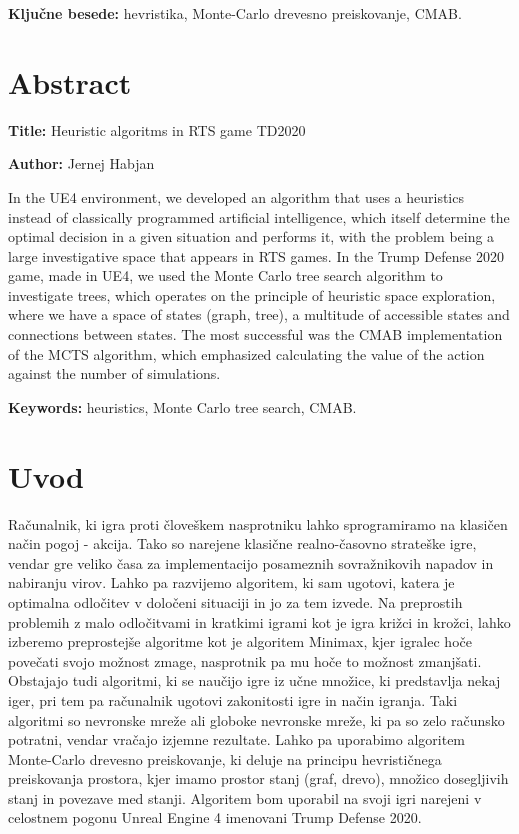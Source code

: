 \documentclass[a4paper, 12pt]{book}
\newcommand{\ttitleEn}{Heuristic algoritms in RTS game TD2020}
\newcommand{\tauthor}{Jernej Habjan}
\newcommand{\tkeywords}{hevristika, Monte-Carlo drevesno preiskovanje, CMAB}
\newcommand{\tkeywordsEn}{heuristics, Monte Carlo tree search, CMAB}
\newcommand{\clearemptydoublepage}{\newpage{\pagestyle{empty}\cleardoublepage}}
\begin{document}
\bigskip

\noindent\textbf{Ključne besede:} \tkeywords.
\clearemptydoublepage

\chapter*{Abstract}

\noindent\textbf{Title:} \ttitleEn
\bigskip

\noindent\textbf{Author:} \tauthor
\bigskip

\noindent In the UE4 environment, we developed an algorithm that uses a heuristics instead of classically programmed artificial intelligence, which itself determine the optimal decision in a given situation and performs it, with the problem being a large investigative space that appears in RTS games.
In the Trump Defense 2020 game, made in UE4, we used the Monte Carlo tree search algorithm to investigate trees, which operates on the principle of heuristic space exploration, where we have a space of states (graph, tree), a multitude of accessible states and connections between states.
The most successful was the CMAB implementation of the MCTS algorithm, which emphasized calculating the value of the action against the number of simulations.


\bigskip

\noindent\textbf{Keywords:} \tkeywordsEn.
\clearemptydoublepage

\mainmatter
\setcounter{page}{1}
\pagestyle{fancy}

\chapter{Uvod}
Računalnik, ki igra proti človeškem nasprotniku lahko sprogramiramo na klasičen način pogoj - akcija. Tako so narejene klasične realno-časovno strateške igre, vendar gre veliko časa za implementacijo posameznih sovražnikovih napadov in nabiranju virov.
Lahko pa razvijemo algoritem, ki sam ugotovi, katera je optimalna odločitev v določeni situaciji in jo za tem izvede.
Na preprostih problemih z malo odločitvami in kratkimi igrami kot je igra križci in krožci, lahko izberemo preprostejše algoritme kot je algoritem Minimax, kjer igralec hoče povečati svojo možnost zmage, nasprotnik pa mu hoče to možnost zmanjšati.
Obstajajo tudi algoritmi, ki se naučijo igre iz učne množice, ki predstavlja nekaj iger, pri tem pa računalnik ugotovi zakonitosti igre in način igranja.
Taki algoritmi so nevronske mreže ali globoke nevronske mreže, ki pa so zelo računsko potratni, vendar vračajo izjemne rezultate. 
Lahko pa uporabimo algoritem Monte-Carlo drevesno preiskovanje, ki deluje na principu hevrističnega preiskovanja prostora, kjer imamo prostor stanj (graf, drevo), množico dosegljivih stanj in povezave med stanji.
Algoritem bom uporabil na svoji igri narejeni v celostnem pogonu Unreal Engine 4 imenovani Trump Defense 2020.
\end{document}
